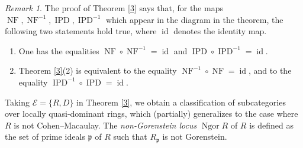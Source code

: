 \documentclass{amsart}
\theoremstyle{definition}
\theoremstyle{remark}
\newtheorem{rem}[thm]{Remark}
\numberwithin{equation}{thm}
\def\E{\mathcal{E}}
\def\id{\operatorname{id}}
\def\ipd{\operatorname{IPD}}
\def\nf{\operatorname{NF}}
\def\ng{\operatorname{Ngor}}
\def\p{\mathfrak{p}}
\begin{document}
\begin{rem}
The proof of Theorem \ref{3} says that, for the maps $\nf,\nf^{-1},\ipd,\ipd^{-1}$ which appear in the diagram in the theorem, the following two statements hold true, where $\id$ denotes the identity map.
\begin{enumerate}[(1)]
\item
One has the equalities $\nf\circ\nf^{-1}=\id$ and $\ipd \circ \ipd^{-1}=\id$.
\item
Theorem \ref{3}(2) is equivalent to the equality $\nf^{-1}\circ\nf=\id$, and to the equality $\ipd^{-1}\circ\ipd=\id$.
\end{enumerate}
\end{rem}

Taking $\E=\{R, D\}$ in Theorem \ref{3}, we obtain a classification of subcategories over locally quasi-dominant rings, which (partially) generalizes \cite[Corollary 10.17]{T23} to the case where $R$ is not Cohen--Macaulay.
The \textit{non-Gorenstein locus} $\ng R$ of $R$ is defined as the set of prime ideals $\p$ of $R$ such that $R_\p$ is not Gorenstein.
\end{document}
